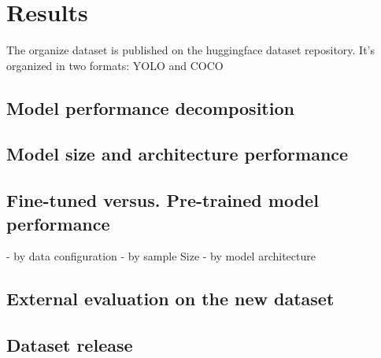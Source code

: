 \section{Results}


The organize dataset is published on the huggingface dataset repository. It's organized in two formats: YOLO and COCO

\subsection*{Model performance decomposition}

\subsection*{Model size and architecture performance}

\subsection*{Fine-tuned versus. Pre-trained model performance}
- by data configuration
- by sample Size
- by model architecture

\subsection*{External evaluation on the new dataset}

\subsection{Dataset release}
